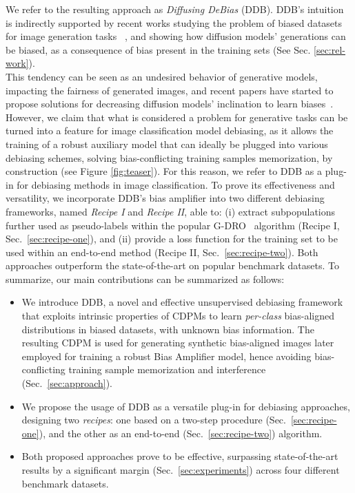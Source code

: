 We refer to the resulting approach as \textit{Diffusing DeBias} (DDB). DDB's intuition is indirectly supported by recent works studying the problem of biased datasets for image generation tasks ~\cite{d2024openbias, kim2024training}, and showing how diffusion models' generations can be biased, as a consequence of bias present in the training sets (See Sec. \ref{sec:rel-work}). 
\\
This tendency can be seen as an undesired behavior of generative models, impacting the fairness of generated images, and recent papers have started to propose solutions for decreasing diffusion models' inclination to learn  biases~\cite{DBLP:journals/corr/abs-2408-15094, kim2024training, DBLP:conf/icb/PereraP23}. 
However, we claim that what is considered a problem for generative tasks can be turned into a feature for image classification model debiasing, as it allows the training of a robust auxiliary model that can ideally be plugged into various debiasing schemes, solving bias-conflicting training samples memorization, by construction (see Figure \ref{fig:teaser}).
For this reason, we refer to DDB as a plug-in for debiasing methods in image classification. %
To prove its effectiveness and versatility, we incorporate DDB's bias amplifier into two different debiasing frameworks, named \textit{Recipe I} and \textit{Recipe II}, able to: 
(i) extract subpopulations further used as pseudo-labels within the popular G-DRO~\cite{Sagawa*2020Distributionally} algorithm (Recipe I, Sec.~\ref{sec:recipe-one}), and (ii) provide a loss function for the training set to be used within an end-to-end method (Recipe II, Sec.~\ref{sec:recipe-two}).
Both approaches outperform the state-of-the-art on popular benchmark datasets. 
To summarize, our main contributions can be summarized as follows:
\begin{itemize}
    \item We introduce DDB, a novel and effective unsupervised debiasing framework that exploits intrinsic properties of CDPMs to learn \textit{per-class} bias-aligned distributions in biased datasets, with unknown bias information. The resulting CDPM is used for generating synthetic bias-aligned images later employed for training a robust Bias Amplifier model, hence avoiding bias-conflicting training sample memorization and interference (Sec.~\ref{sec:approach}). 
    \item We propose the usage of DDB as a versatile plug-in for debiasing approaches, designing two \textit{recipes}: one based on a two-step procedure (Sec.~\ref{sec:recipe-one}), and the other as an end-to-end (Sec.~\ref{sec:recipe-two}) algorithm. %
    \item Both proposed approaches prove to be effective, surpassing state-of-the-art results by a significant margin (Sec.~\ref{sec:experiments}) across four different benchmark datasets. 
\end{itemize}